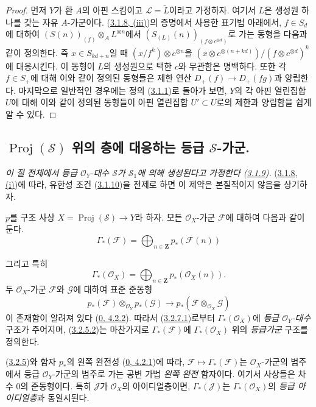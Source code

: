 \begin{proof}
먼저 $Y$가 환 $A$의 아핀 스킴이고 $\mathcal{L}=\widetilde{L}$이라고
가정하자. 여기서 $L$은 생성원 하나를 갖는 자유 $A$-가군이다.
(\hyperref[II.3.1.8-ko]{3.1.8, (iii)})의 증명에서 사용한 표기법 아래에서,
$f\in S_d$에 대하여
$(S(n))_{(f)}\otimes_A L^{\otimes n}$에서
$(S_{(L)}(n))_{(f\otimes c^{\otimes d})}$로 가는 동형을 다음과 같이
정의한다. 즉 $x\in S_{kd+n}$일 때
$(x/f^k)\otimes c^{\otimes n}$을
$(x\otimes c^{\otimes(n+kd)})/(f\otimes c^{\otimes d})^k$에 대응시킨다.
이 동형이 $L$의 생성원으로 택한 $c$와 무관함은 명백하다. 또한 각
$f\in S_+$에 대해 이와 같이 정의된 동형들은 제한 연산
$D_+(f)\to D_+(fg)$과 양립한다. 마지막으로 일반적인 경우에는 정의
(\hyperref[II.3.1.1-ko]{3.1.1})로 돌아가 보면, $Y$의 각 아핀 열린집합
$U$에 대해 이와 같이 정의된 동형들이 아핀 열린집합 $U'\subset U$로의
제한과 양립함을 쉽게 알 수 있다.
\end{proof}

\subsection{$\operatorname{Proj}(\mathcal{S})$ 위의 층에 대응하는 등급
$\mathcal{S}$-가군.}
\label{subsection:II.3.3-ko}

\emph{이 절 전체에서 등급 $\mathcal{O}_Y$-대수 $\mathcal{S}$가
$\mathcal{S}_1$에 의해 생성된다고 가정한다
(\hyperref[II.3.1.9-ko]{3.1.9}).}
(\hyperref[II.3.1.8-ko]{3.1.8, (i)})에 따라, 유한성 조건
(\hyperref[II.3.1.10-ko]{3.1.10})을 전제로 하면 이 제약은 본질적이지
않음을 상기하자.

\begin{env}[3.3.1]
\label{II.3.3.1-ko}
$p$를 구조 사상 $X=\operatorname{Proj}(\mathcal{S})\to Y$라 하자.
모든 $\mathcal{O}_X$-가군 $\mathcal{F}$에 대하여 다음과 같이 둔다.
\[
\label{II.3.3.1.1-ko}
  \Gamma_*(\mathcal{F})
  =\bigoplus_{n\in\mathbf{Z}}p_*(\mathcal{F}(n))
\tag{3.3.1.1}
\]


그리고 특히
\[
\label{II.3.3.1.2-ko}
  \Gamma_*(\mathcal{O}_X)
  =\bigoplus_{n\in\mathbf{Z}}p_*(\mathcal{O}_X(n)).
\tag{3.3.1.2}
\]
두 $\mathcal{O}_X$-가군 $\mathcal{F}$와 $\mathcal{G}$에 대하여 표준
준동형
\[
  p_*(\mathcal{F})\otimes_{\mathcal{O}_Y}p_*(\mathcal{G})
  \longrightarrow
  p_*(\mathcal{F}\otimes_{\mathcal{O}_X}\mathcal{G})
\]
이 존재함이 알려져 있다
(\hyperref[0.4.2.2-ko]{0, 4.2.2}). 따라서
(\hyperref[II.3.2.7.1-ko]{3.2.7.1})로부터
$\Gamma_*(\mathcal{O}_X)$에 \emph{등급 $\mathcal{O}_Y$-대수} 구조가 주어지며,
(\hyperref[II.3.2.5.2-ko]{3.2.5.2})는 마찬가지로
$\Gamma_*(\mathcal{F})$에 $\Gamma_*(\mathcal{O}_X)$ 위의 \emph{등급가군}
구조를 정의한다.

(\hyperref[II.3.2.5-ko]{3.2.5})와 함자 $p_*$의 왼쪽 완전성
(\hyperref[0.4.2.1-ko]{0, 4.2.1})에 따라,
$\mathcal{F}\mapsto\Gamma_*(\mathcal{F})$는 $\mathcal{O}_X$-가군의
범주에서 등급 $\mathcal{O}_Y$-가군의 범주로 가는 공변 가법
\emph{왼쪽 완전} 함자이다. 여기서 사상들은 차수 $0$의 준동형이다. 특히
$\mathcal{J}$가 $\mathcal{O}_X$의 아이디얼층이면,
$\Gamma_*(\mathcal{J})$는 $\Gamma_*(\mathcal{O}_X)$의
\emph{등급 아이디얼층}과 동일시된다.
\end{env}

